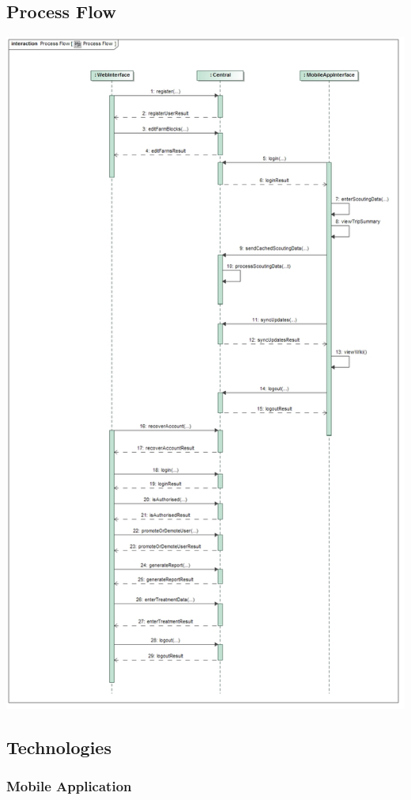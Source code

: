 \documentclass[11pt,a4paper,titlepage]{article}
\begin{document}
	\subsection{Process Flow}
		\includegraphics[width=\linewidth]{ProcessFlow}	
	\subsection{Technologies}
		\subsubsection{Mobile Application}
\end{document}
